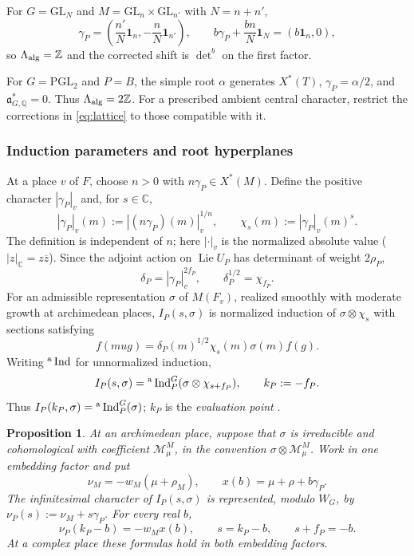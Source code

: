 \documentclass[12pt]{amsart}
\numberwithin{equation}{section}
\theoremstyle{plain}
\newtheorem{proposition}[theorem]{Proposition}
\theoremstyle{definition}
\theoremstyle{remark}
\renewcommand{\bar}{\overline}
\newcommand{\cM}{\mathcal M}
\begin{document}
For $G=\mathrm{GL}_N$ and $M=\mathrm{GL}_n\times\mathrm{GL}_{n'}$ with $N=n+n'$,
\[
 \gamma_P=\left(\frac{n'}N\mathbf1_n,-\frac nN\mathbf1_{n'}\right),
 \qquad
 b\gamma_P+\frac{bn}{N}\mathbf1_N=(b\mathbf1_n,0),
\]
so $\Lambda_{\rm alg}=\mathbb Z$ and the corrected shift is $\det^b$ on the first factor.

For $G=\mathrm{PGL}_2$ and $P=B$, the simple root $\alpha$ generates $X^*(T)$, $\gamma_P=\alpha/2$, and $\mathfrak a_{G,\mathbb Q}^*=0$. Thus $\Lambda_{\rm alg}=2\mathbb Z$. For a prescribed ambient central character, restrict the corrections in \eqref{eq:lattice} to those compatible with it.

\subsubsection{Induction parameters and root hyperplanes}
At a place $v$ of $F$, choose $n>0$ with $n\gamma_P\in X^*(M)$. Define the positive character $|\gamma_P|_v$ and, for $s\in\mathbb C$,
\[
 |\gamma_P|_v(m):=|(n\gamma_P)(m)|_v^{1/n},
 \qquad \chi_s(m):=|\gamma_P|_v(m)^s.
\]
The definition is independent of $n$; here $|\cdot|_v$ is the normalized absolute value ($|z|_{\mathbb C}=z\bar z$). Since the adjoint action on $\operatorname{Lie}U_P$ has determinant of weight $2\rho_P$, 
\[
 \delta_P=|\gamma_P|_v^{2f_P},
 \qquad \delta_P^{1/2}=\chi_{f_P}.
\]
For an admissible representation $\sigma$ of $M(F_v)$, realized smoothly with moderate growth at archimedean places, $I_P(s,\sigma)$ is normalized induction of $\sigma\otimes\chi_s$ with sections satisfying 
\[
f(mug)=\delta_P(m)^{1/2}\chi_s(m)\sigma(m)f(g).
\]
Writing ${}^{\rm a}\operatorname{Ind}$ for unnormalized induction, 
\begin{equation}\label{eq:induction-conversion}
 I_P(s,\sigma)
   ={}^{\rm a}\operatorname{Ind}_P^G
          (\sigma\otimes\chi_{s+f_P}),
 \qquad k_P:=-f_P.
\end{equation}
Thus $I_P(k_P,\sigma)={}^{\rm a}\operatorname{Ind}_P^G(\sigma)$; $k_P$ is the \emph{evaluation point}
\cite[Definition~2.1.1]{RaghuramPadic2023}.

\begin{proposition} \label{prop:coefficient-spectral-parameters}
At an archimedean place, suppose that $\sigma$ is irreducible and cohomological with coefficient $\cM_\mu^M$, in the convention $\sigma\otimes\cM_\mu^M$. Work in one embedding factor and put
\[
 \nu_M=-w_M(\mu+\rho_M),\qquad
 x(b)=\mu+\rho+b\gamma_P.
\]
The infinitesimal character of $I_P(s,\sigma)$ is represented, modulo $W_G$, by $\nu_P(s):=\nu_M+s\gamma_P$. For every real $b$, 
\begin{equation}\label{eq:coefficient-spectral}
 \nu_P(k_P-b)=-w_Mx(b),
 \qquad s=k_P-b,
 \qquad s+f_P=-b.
\end{equation}
At a complex place these formulas hold in both embedding factors.
\end{proposition}
\end{document}
